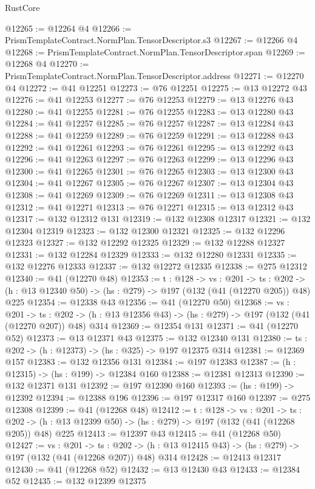 \begin{lexlean}{RustCore}
\begin{coremodule}
@12265 := @12264 @4
@12266 := PrismTemplateContract.NormPlan.TensorDescriptor.s3
@12267 := @12266 @4
@12268 := PrismTemplateContract.NormPlan.TensorDescriptor.span
@12269 := @12268 @4
@12270 := PrismTemplateContract.NormPlan.TensorDescriptor.address
@12271 := @12270 @4
@12272 := @41 @12251
@12273 := @76 @12251
@12275 := @13 @12272 @43
@12276 := @41 @12253
@12277 := @76 @12253
@12279 := @13 @12276 @43
@12280 := @41 @12255
@12281 := @76 @12255
@12283 := @13 @12280 @43
@12284 := @41 @12257
@12285 := @76 @12257
@12287 := @13 @12284 @43
@12288 := @41 @12259
@12289 := @76 @12259
@12291 := @13 @12288 @43
@12292 := @41 @12261
@12293 := @76 @12261
@12295 := @13 @12292 @43
@12296 := @41 @12263
@12297 := @76 @12263
@12299 := @13 @12296 @43
@12300 := @41 @12265
@12301 := @76 @12265
@12303 := @13 @12300 @43
@12304 := @41 @12267
@12305 := @76 @12267
@12307 := @13 @12304 @43
@12308 := @41 @12269
@12309 := @76 @12269
@12311 := @13 @12308 @43
@12312 := @41 @12271
@12313 := @76 @12271
@12315 := @13 @12312 @43
@12317 := @132 @12312 @131
@12319 := @132 @12308 @12317
@12321 := @132 @12304 @12319
@12323 := @132 @12300 @12321
@12325 := @132 @12296 @12323
@12327 := @132 @12292 @12325
@12329 := @132 @12288 @12327
@12331 := @132 @12284 @12329
@12333 := @132 @12280 @12331
@12335 := @132 @12276 @12333
@12337 := @132 @12272 @12335
@12338 := @275 @12312
@12340 := @41 (@12270 @48)
@12353 := {t : @128} ->
  {vs : @201} ->
  {ts : @202} -> (h : @13 @12340 @50) -> (hs : @279) -> @197 (@132 (@41 (@12270 @205)) @48) @225
@12354 := @12338 @43
@12356 := @41 (@12270 @50)
@12368 := {vs : @201} ->
  {ts : @202} -> (h : @13 @12356 @43) -> (hs : @279) -> @197 (@132 (@41 (@12270 @207)) @48) @314
@12369 := @12354 @131
@12371 := @41 (@12270 @52)
@12373 := @13 @12371 @43
@12375 := @132 @12340 @131
@12380 := {ts : @202} -> (h : @12373) -> (hs : @325) -> @197 @12375 @314
@12381 := @12369 @157
@12383 := @132 @12356 @131
@12384 := @197 @12383
@12387 := (h : @12315) -> (hs : @199) -> @12384 @160
@12388 := @12381 @12313
@12390 := @132 @12371 @131
@12392 := @197 @12390 @160
@12393 := (hs : @199) -> @12392
@12394 := @12388 @196
@12396 := @197 @12317 @160
@12397 := @275 @12308
@12399 := @41 (@12268 @48)
@12412 := {t : @128} ->
  {vs : @201} ->
  {ts : @202} -> (h : @13 @12399 @50) -> (hs : @279) -> @197 (@132 (@41 (@12268 @205)) @48) @225
@12413 := @12397 @43
@12415 := @41 (@12268 @50)
@12427 := {vs : @201} ->
  {ts : @202} -> (h : @13 @12415 @43) -> (hs : @279) -> @197 (@132 (@41 (@12268 @207)) @48) @314
@12428 := @12413 @12317
@12430 := @41 (@12268 @52)
@12432 := @13 @12430 @43
@12433 := @12384 @52
@12435 := @132 @12399 @12375

\end{coremodule}
\end{lexlean}
